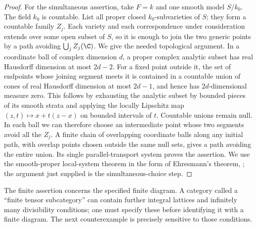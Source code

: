 \begin{proof}
For the simultaneous assertion, take $F=k$ and one smooth model $S/k_0$. The field $k_0$ is countable. List all proper closed $k_0$-subvarieties of $S$; they form a countable family $Z_j$. Each variety and each correspondence under consideration extends over some open subset of $S$, so it is enough to join the two generic points by a path avoiding $\bigcup_j Z_j(\C)$. We give the needed topological argument. In a coordinate ball of complex dimension $d$, a proper complex analytic subset has real Hausdorff dimension at most $2d-2$. For a fixed point outside it, the set of endpoints whose joining segment meets it is contained in a countable union of cones of real Hausdorff dimension at most $2d-1$, and hence has $2d$-dimensional measure zero. This follows by exhausting the analytic subset by bounded pieces of its smooth strata and applying the locally Lipschitz map $(z,t)\mapsto x+t(z-x)$ on bounded intervals of $t$. Countable unions remain null. In each ball we can therefore choose an intermediate point whose two segments avoid all the $Z_j$. A finite chain of overlapping coordinate balls along any initial path, with overlap points chosen outside the same null sets, gives a path avoiding the entire union. Its single parallel-transport system proves the assertion. We use the smooth-proper local-system theorem in the form of Ehresmann's theorem, \cite[Theorem 12.1.1]{Arapura2003}; the argument just supplied is the simultaneous-choice step.
\end{proof}

The finite assertion concerns the specified finite diagram. A category called a ``finite tensor subcategory'' can contain further integral lattices and infinitely many divisibility conditions; one must specify these before identifying it with a finite diagram. The next counterexample is precisely sensitive to those conditions.

